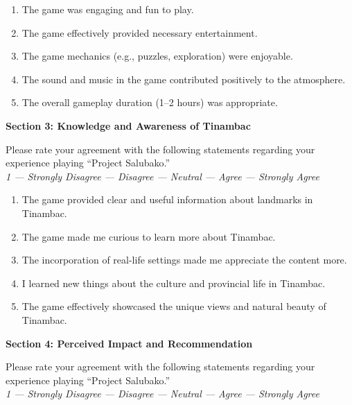 \documentclass{research}
\begin{document}
\begin{enumerate}
  \item The game was engaging and fun to play.
  \item The game effectively provided necessary entertainment.
  \item The game mechanics (e.g., puzzles, exploration) were enjoyable.
  \item The sound and music in the game contributed positively to the atmosphere.
  \item The overall gameplay duration (1--2 hours) was appropriate.
\end{enumerate}

\vspace{0.5em}
\textbf{Section 3: Knowledge and Awareness of Tinambac}

\noindent Please rate your agreement with the following statements regarding your
experience playing ``Project Salubako.''\\
\textit{1 --- Strongly Disagree  --- Disagree  --- Neutral  --- Agree  --- Strongly Agree}

\begin{enumerate}
  \item The game provided clear and useful information about landmarks in Tinambac.
  \item The game made me curious to learn more about Tinambac.
  \item The incorporation of real-life settings made me appreciate the content more.
  \item I learned new things about the culture and provincial life in Tinambac.
  \item The game effectively showcased the unique views and natural beauty of Tinambac.
\end{enumerate}

\vspace{0.5em}
\textbf{Section 4: Perceived Impact and Recommendation}

\noindent Please rate your agreement with the following statements regarding your
experience playing ``Project Salubako.''\\
\textit{1 --- Strongly Disagree  --- Disagree  --- Neutral  --- Agree  --- Strongly Agree}
\end{document}
